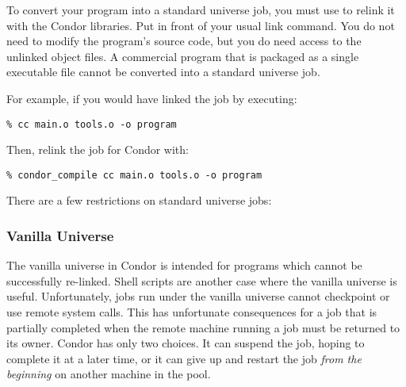 To convert your program into a standard universe job, you must use
 to relink it with the Condor libraries.
Put  in front of your usual link command.
You do not need to modify the program's source code,
but you do need access to the unlinked object files.
A commercial program that is packaged as a single executable file cannot be
converted into a standard universe job.

For example, if you would have linked the job by executing:
\begin{verbatim}
% cc main.o tools.o -o program
\end{verbatim}

Then, relink the job for Condor with:
\begin{verbatim}
% condor_compile cc main.o tools.o -o program
\end{verbatim}

There are a few restrictions on standard universe jobs:




\subsubsection{Vanilla Universe}

The vanilla universe in Condor is intended
for programs which cannot
be successfully re-linked.
Shell scripts are another case where the vanilla universe
is useful.
Unfortunately, jobs run under the vanilla universe cannot checkpoint or use
remote system calls. 
This has unfortunate consequences for a job that is partially
completed 
when the remote machine running a job must be returned
to its owner.
Condor has only two choices.  It can suspend the job, hoping to
complete it at a later time,
or it can give up and restart the job \emph{from the beginning} 
on another machine in the pool.


